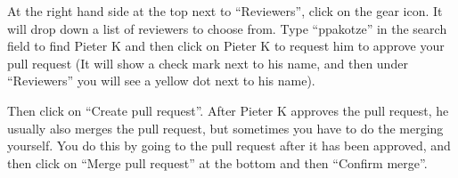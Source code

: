 At the right hand side at the top next to “Reviewers”, click on the gear icon. It will drop down a list of reviewers to choose from. Type “ppakotze” in the search field to find Pieter K and then click on Pieter K to request him to approve your pull request (It will show a check mark next to his name, and then under “Reviewers” you will see a yellow dot next to his name).



Then click on “Create pull request”.
After Pieter K approves the pull request, he usually also merges the pull request, but sometimes you have to do the merging yourself. You do this by going to the pull request after it has been approved, and then click on “Merge pull request” at the bottom and then “Confirm merge”.


